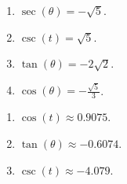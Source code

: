 \documentclass{ximera}
\begin{document}
\begin{multicols}{4}

\begin{enumerate}
\setcounter{enumi}{\value{HW}}

\item $\sec(\theta) = -\sqrt{5}$.  

\item  $\csc(t) = \sqrt{5}$.  

\item  $\tan(\theta) = -2\sqrt{2}$.  

\item $\cos(\theta) = -\frac{\sqrt{5}}{3}$.

\setcounter{HW}{\value{enumi}}

\end{enumerate}

\end{multicols}

\begin{multicols}{3}

\begin{enumerate}
\setcounter{enumi}{\value{HW}}

\item  $\cos(t) \approx 0.9075$.  

\item $\tan(\theta) \approx - 0.6074$.  

\item  $\csc(t) \approx -4.079$.  

\setcounter{HW}{\value{enumi}}

\end{enumerate}

\end{multicols}
\end{document}
